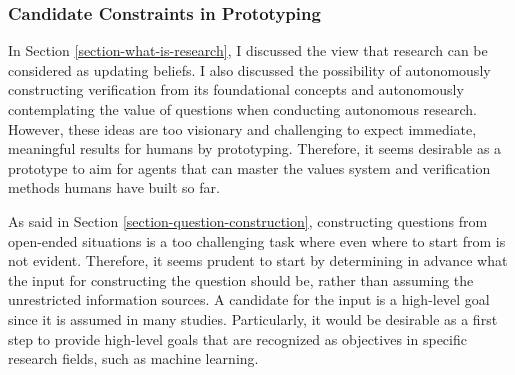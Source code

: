\subsubsection{Candidate Constraints in Prototyping}

In Section \ref{section-what-is-research}, I discussed the view that research can be considered as updating beliefs. I also discussed the possibility of autonomously constructing verification from its foundational concepts and autonomously contemplating the value of questions when conducting autonomous research. However, these ideas are too visionary and challenging to expect immediate, meaningful results for humans by prototyping. Therefore, it seems desirable as a prototype to aim for agents that can master the values system and verification methods humans have built so far.

As said in Section \ref{section-question-construction}, constructing questions from open-ended situations is a too challenging task where even where to start from is not evident. Therefore, it seems prudent to start by determining in advance what the input for constructing the question should be, rather than assuming the unrestricted information sources. A candidate for the input is a high-level goal since it is 
assumed in many studies. Particularly, it would be desirable as a first step to provide high-level goals that are recognized as objectives in specific research fields, such as machine learning.


